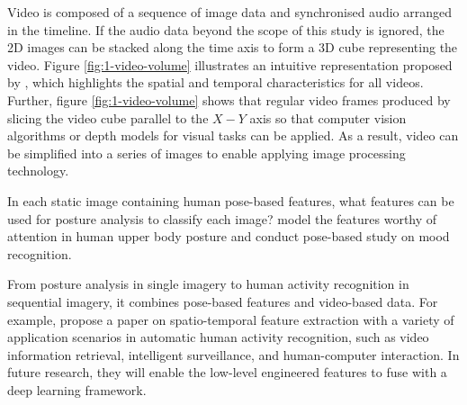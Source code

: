 Video is composed of a sequence of image data and synchronised audio arranged in the timeline. 
If the audio data beyond the scope of this study is ignored, the 2D images can be stacked along the time axis to form a 3D cube representing the video. Figure \ref{fig:1-video-volume} illustrates an intuitive representation proposed by \citet{fels1999interactive}, which highlights the spatial and temporal characteristics for all videos.
Further, figure \ref{fig:1-video-volume} shows that regular video frames produced by slicing the video cube parallel to the $X-Y$ axis so that computer vision algorithms or depth models for visual tasks can be applied.
As a result, video can be simplified into a series of images to enable applying image processing technology.

In each static image containing human pose-based features, what features can be used for posture analysis to classify each image? 
\citet{thrasher2011mood} model the features worthy of attention in human upper body posture and conduct pose-based study on mood recognition.

From posture analysis in single imagery to human activity recognition in sequential imagery, it combines pose-based features and video-based data.
For example, \citet{yao2016spatio} propose a paper on spatio-temporal feature extraction with a variety of application scenarios in automatic human activity recognition, such as video information retrieval, intelligent surveillance, and human-computer interaction.
In future research, they will enable the low-level engineered features to fuse with a deep learning framework.

\citet{schuldt2004recognizing}

\citet{gorelick2007actions}

\citet{marszalek2009actions}

\citet{Soomro2014}